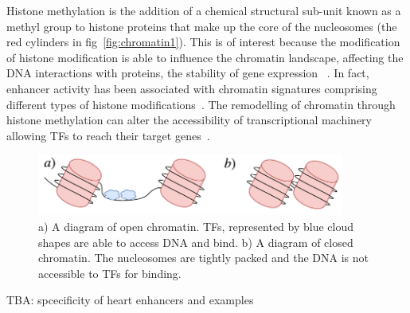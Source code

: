         Histone methylation is the addition of a chemical structural sub-unit known as a methyl group to histone proteins that make up the core of the nucleosomes (the red cylinders in fig~\ref{fig:chromatin1}). This is of interest because the modification of histone modification is able to influence the chromatin landscape, affecting the DNA interactions with proteins, the stability of gene expression ~\cite{jaenisch2003epigenetic, whetstine2009histone}.
        In fact, enhancer activity has been associated with chromatin signatures comprising different types of histone modifications~\cite{heintzman2007distinct, creyghton2010histone, rada2011unique}.
        The remodelling of chromatin through histone methylation can alter the accessibility of transcriptional machinery allowing TFs to reach their target genes~\cite{gibney2010epigenetics, holoch2015rna}. 

        \begin{figure}[H]
            \centering
            \includegraphics[width=0.9\textwidth]{OpenCloseChromatin.pdf}
            \caption{a) A diagram of open chromatin. TFs, represented by blue cloud shapes are able to access DNA and bind. b) A diagram of closed chromatin. The nucleosomes are tightly packed and the DNA is not accessible to TFs for binding.}
            \label{fig:openclose}
        \end{figure}
        TBA: spcecificity of heart enhancers and examples

        


        
        
